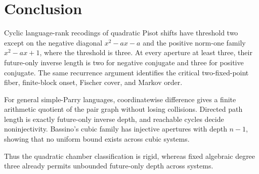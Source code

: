 \section{Conclusion}
\label{sec:discussion}

Cyclic language-rank recodings of quadratic Pisot shifts have threshold two
except on the negative diagonal $x^2-ax-a$ and the positive norm-one family
$x^2-ax+1$, where the threshold is three.  At every aperture at least three,
their future-only inverse length is two for negative conjugate and three for
positive conjugate.  The same recurrence argument identifies the critical
two-fixed-point fiber, finite-block onset, Fischer cover, and Markov order.

For general simple-Parry languages, coordinatewise difference gives a finite
arithmetic quotient of the pair graph without losing collisions.  Directed
path length is exactly future-only inverse depth, and reachable cycles decide
noninjectivity.  Bassino's cubic family has injective apertures with depth
$n-1$, showing that no uniform bound exists across cubic systems.

Thus the quadratic chamber classification is rigid, whereas fixed algebraic
degree three already permits unbounded future-only depth across systems.
